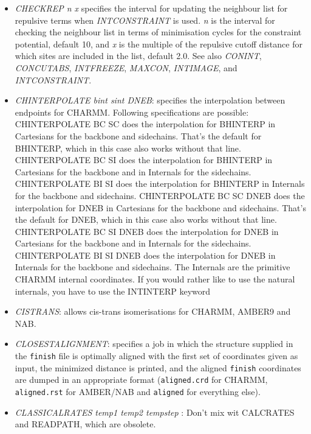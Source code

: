 \documentclass[12pt,a4paper,dvips]{article}
\begin{document}
\begin{itemize}
\item{\it CHECKREP n x\/} specifies the interval for updating the neighbour list
for repulsive terms when {\it INTCONSTRAINT\/} is used. 
{\it n} is the interval for checking the neighbour list in terms of minimisation
cycles for the constraint potential, default 10, and {\it x\/} is the
multiple of the repulsive cutoff distance for which sites are included
in the list, default 2.0.
See also
{\it CONINT\/},
{\it CONCUTABS\/},
{\it INTFREEZE\/},
{\it MAXCON\/},
{\it INTIMAGE\/}, and
{\it INTCONSTRAINT\/}.

\item {\it CHINTERPOLATE bint sint DNEB\/}: specifies the interpolation between endpoints
for CHARMM. Following specifications are possible: CHINTERPOLATE BC SC does the 
interpolation for BHINTERP in Cartesians for the backbone and sidechains. 
That's the default for BHINTERP, which in this case also works without that line.
CHINTERPOLATE BC SI does the interpolation for BHINTERP in Cartesians for
the backbone and in Internals for the sidechains.
CHINTERPOLATE BI SI does the interpolation for BHINTERP in Internals for
the backbone and sidechains.
CHINTERPOLATE BC SC DNEB does the interpolation for DNEB in Cartesians for
the backbone and sidechains. That's the default for DNEB, which
in this case also works without that line.
CHINTERPOLATE BC SI DNEB does the interpolation for DNEB in Cartesians for
the backbone and in Internals for the sidechains.
CHINTERPOLATE BI SI DNEB does the interpolation for DNEB in Internals for
the backbone and sidechains.
The Internals are the primitive CHARMM internal coordinates. If you would rather like to
use the natural internals, you have to use the INTINTERP keyword

\item {\it CISTRANS\/}: allows cis-trans isomerisations for CHARMM, AMBER9 and NAB.

\item {\it CLOSESTALIGNMENT\/}: specifies a job in which the structure supplied in the {\tt finish} file 
is optimally aligned with the first set of coordinates given as input, the minimized distance is printed,  
and the aligned {\tt finish} coordinates are dumped in an appropriate format 
({\tt aligned.crd} for CHARMM, {\tt aligned.rst} for AMBER/NAB and {\tt aligned} for everything else).

\item {\it CLASSICALRATES temp1 temp2 tempstep \/}: Don't mix wit CALCRATES and READPATH, which are obsolete.


\end{itemize}
\end{document}
